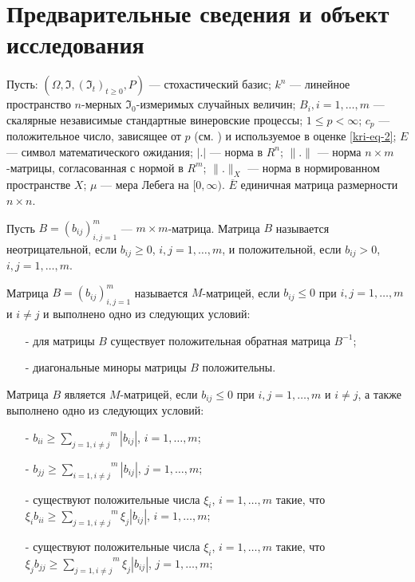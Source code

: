 \section{Предварительные сведения и объект исследования}

Пусть:  $(\Omega, \Im, (\Im_t)_{t \ge 0}, P)$ --- стохастический базис;  $k^n$ --- линейное пространство  $n$-мерных $\Im_0$-измеримых случайных величин;  $B_i, i=1, \dots, m$ --- скалярные независимые стандартные винеровские процессы; $1 \le p < \infty$;  $c_p$ --- положительное число, зависящее от $p$ (см. \cite[с. 65]{kri-bib-17}) и используемое в оценке \eqref{kri-eq-2}; $E$ --- символ математического ожидания; $|.|$ --- норма в $R^n$; $\|.\|$ --- норма $n \times m$-матрицы, согласованная с нормой в $R^m$; $\|.\|_X$ --- норма в нормированном пространстве  $X$; $\mu$ --- мера Лебега на $[0, \infty )$.
$\overline E$ единичная матрица размерности  $n\times n$.

Пусть $B=(b_{ij})_{i,j=1}^m$ --- $m\times m$-матрица.
Матрица  $B$ называется неотрицательной, если  $b_{ij} \ge 0$, $i,j=1, \dots ,m$, и положительной, если $b_{ij} > 0$, $i, j=1, \dots, m$.

\begin{definition}
\cite{kri-bib-18} Матрица  $B=(b_{ij})_{i,j=1}^m$ называется $M$-матрицей, если $b_{ij}\le 0$ при  $i,j=1,\dots,m$ и $i\neq j$ и выполнено одно из следующих условий:

\begin{itemize}
	\item[-]
	для матрицы  $B$ существует положительная обратная матрица $B^{-1}$;
	
	\item[-]
	диагональные миноры матрицы  $B$ положительны.
\end{itemize}
\end{definition}

\begin{lemma}
\cite{kri-bib-18} Матрица $B$ является $M$-матрицей, если $b_{ij}\le 0$ при $i,j=1,\dots,m$ и $i\neq j$, а также выполнено одно из следующих условий:

\begin{itemize}
	\item[-]
	$b_{ii}\ge \overset m{\underset{j=1,i\neq j}{\sum }}|b_{ij}|$, $i=1,\dots,m$;
	
	\item[-]
	$b_{jj}\ge \overset m{\underset{i=1,i\neq j}{\sum }}|b_{ij}|$, $j=1,\dots,m$;
	
	\item[-]
	существуют положительные числа $\xi_i$, $i=1,\dots,m$ такие, что $\xi_ib_{ii}\ge \overset m{\underset{j=1,i\neq j}{\sum}}\xi_j|b_{ij}|$, $i=1,\dots,m$;
	
	\item[-]
	существуют положительные числа $\xi_i$, $i=1,\dots,m$ такие, что $\xi_jb_{jj}\ge \overset m{\underset{j=1,i\neq j}{\sum}}\xi_j|b_{ij}|$, $j=1,\dots,m$;
\end{itemize}
\end{lemma}

